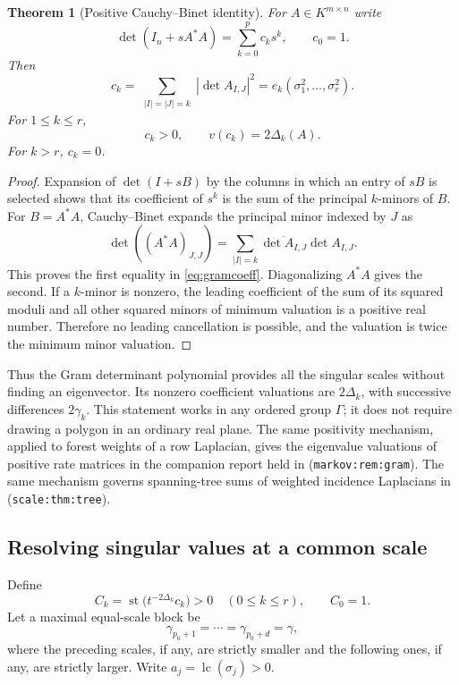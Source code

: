 \documentclass[11pt,a4paper]{article}
\numberwithin{equation}{section}
\newtheorem{theorem}{Theorem}[section]
\theoremstyle{definition}
\theoremstyle{remark}
\newcommand{\st}{\operatorname{st}}
\newcommand{\lc}{\operatorname{lc}}
\begin{document}
\begin{theorem}[Positive Cauchy--Binet identity]\label{thm:gram}
For $A\in K^{m\times n}$ write
\begin{equation}\label{eq:gramgen}
 \det(I_n+sA^*A)=\sum_{k=0}^p c_k s^k,
 \qquad c_0=1.
\end{equation}
Then
\begin{equation}\label{eq:gramcoeff}
 c_k=\sum_{\substack{|I|=|J|=k}}|\det A_{I,J}|^2
     =e_k(\sigma_1^2,\ldots,\sigma_r^2).
\end{equation}
For $1\le k\le r$,
\begin{equation}\label{eq:gramval}
 c_k>0,\qquad v(c_k)=2\Delta_k(A).
\end{equation}
For $k>r$, $c_k=0$.
\end{theorem}
\begin{proof}
Expansion of $\det(I+sB)$ by the columns in which an entry of $sB$ is
selected shows that its coefficient of $s^k$ is the sum of the principal
$k$-minors of $B$. For $B=A^*A$, Cauchy--Binet expands the principal minor
indexed by $J$ as
\[
 \det((A^*A)_{J,J})
 =\sum_{|I|=k}\overline{\det A_{I,J}}\det A_{I,J}.
\]
This proves the first equality in \eqref{eq:gramcoeff}. Diagonalizing
$A^*A$ gives the second. If a $k$-minor is nonzero, the leading coefficient
of the sum of its squared moduli and all other squared minors of minimum
valuation is a positive real number. Therefore no leading cancellation is
possible, and the valuation is twice the minimum minor valuation.
\end{proof}

Thus the Gram determinant polynomial provides all the singular scales
without finding an eigenvector. Its nonzero coefficient valuations are
$2\Delta_k$, with successive differences $2\gamma_k$. This statement works
in any ordered group $\Gamma$; it does not require drawing a polygon in an
ordinary real plane. The same positivity mechanism, applied to forest weights
of a row Laplacian, gives the eigenvalue valuations of positive rate matrices
in the companion report held in
(\texttt{markov:rem:gram}).
The same mechanism governs spanning-tree sums of weighted incidence
Laplacians in 
(\texttt{scale:thm:tree}).

\subsection{Resolving singular values at a common scale}
Define
\[
 C_k=\st\bigl(t^{-2\Delta_k}c_k\bigr)>0\quad(0\le k\le r),
 \qquad C_0=1.
\]
Let a maximal equal-scale block be
\[
 \gamma_{p_0+1}=\cdots=\gamma_{p_0+d}=\gamma,
\]
where the preceding scales, if any, are strictly smaller and the following
ones, if any, are strictly larger. Write $a_j=\lc(\sigma_j)>0$.
\end{document}
